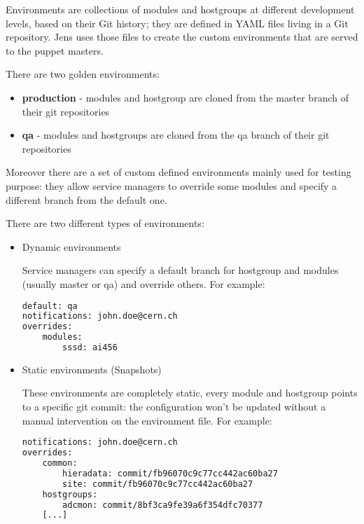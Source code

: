 Environments are collections of modules and hostgroups at different
development levels, based on their Git history; they are defined in YAML
\cite{YAMLWebsite} files living in a Git repository. Jens uses those files
to create the custom environments that are served to the puppet masters.

There are two golden environments:

\begin{itemize}
    \item \textbf{production} - modules and hostgroup are cloned from the master branch of
their git repositories
    \item \textbf{qa} - modules and hostgroups are cloned from the qa branch of their git
repositories
\end{itemize}

Moreover there are a set of custom defined environments mainly used for
testing purpose: they allow service managers to override some modules and
specify a different branch from the default one.

There are two different types of environments:

\begin{itemize} 
    \item Dynamic environments

Service managers can specify a default branch for hostgroup and modules
(usually master or qa) and override others. For example:

\begin{lstlisting}[language=bash, frame=single]
default: qa
notifications: john.doe@cern.ch
overrides:
    modules:
        sssd: ai456
\end{lstlisting}

    \item Static environments (Snapshots) 
    
These environments are completely static, every module and hostgroup
points to a specific git commit: the configuration won't be updated
without a manual intervention on the environment file. For example:

\begin{lstlisting}[language=bash, frame=single]
notifications: john.doe@cern.ch
overrides:
    common:
        hieradata: commit/fb96070c9c77cc442ac60ba27
        site: commit/fb96070c9c77cc442ac60ba27
    hostgroups:
        adcmon: commit/8bf3ca9fe39a6f354dfc70377
    [...]
\end{lstlisting}
\end{itemize}

